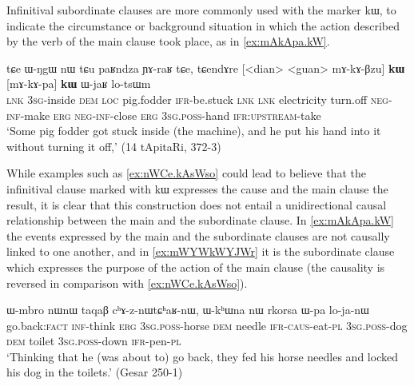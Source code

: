 \documentclass[oldfontcommands,oneside,a4paper,11pt]{article}
\newcommand{\ipa}[1]{{\phon #1}} %
\begin{document}
 Infinitival subordinate clauses are more commonly used with the marker \ipa{kɯ}, to indicate the circumstance or background situation in which the action described by the verb of the main clause took place, as in \ref{ex:mAkApa.kW}. 

\begin{exe}
\ex \label{ex:mAkApa.kW}
\gll
\ipa{tɕe}   	\ipa{ɯ-ŋgɯ}   	\ipa{nɯ} \ipa{tɕu}   	\ipa{paʁndza}   	\ipa{ɲɤ-raʁ}   	\ipa{tɕe,}   	\ipa{tɕendɤre}   	[<dian>   	<guan>   	\ipa{mɤ-kɤ-βzu}] 	\ipa{\textbf{kɯ}}   	[\ipa{mɤ-kɤ-pa}]   	\ipa{\textbf{kɯ}}   	\ipa{ɯ-jaʁ}   	\ipa{lo-tsɯm}   \\
\textsc{lnk} \textsc{3sg}-inside \textsc{dem} \textsc{loc} pig.fodder \textsc{ifr}-be.stuck \textsc{lnk}
\textsc{lnk} electricity turn.off \textsc{neg-inf}-make \textsc{erg}  \textsc{neg-inf}-close \textsc{erg}  \textsc{3sg.poss}-hand \textsc{ifr:upstream}-take \\
\glt `Some pig fodder got stuck inside (the machine), and he put his hand into it without turning it off,' (14 tApitaRi, 372-3)
\end{exe} 

 While  examples such as \ref{ex:nWCe.kAsWso} could lead to believe that the infinitival clause marked with \ipa{kɯ}  expresses the cause and the main clause the result, it is clear that this construction does not entail a unidirectional causal relationship between the main and the subordinate clause. In \ref{ex:mAkApa.kW} the events expressed by the main and the subordinate clauses are not causally linked to one another, and in  \ref{ex:mWYWkWYJWr} it is the subordinate clause which expresses the purpose of the action of the main clause (the causality is reversed in comparison with \ref{ex:nWCe.kAsWso}).

  \begin{exe}
\ex \label{ex:nWCe.kAsWso}
\gll 
[\ipa{nɯɕe}  	\ipa{kɤ-sɯso}]  	\ipa{kɯ,}  	\ipa{ɯ-mbro}  	\ipa{nɯnɯ}  	\ipa{taqaβ}  	\ipa{cʰɤ-z-nɯtɕʰaʁ-nɯ,}  	\ipa{ɯ-kʰɯna}  	\ipa{nɯ}  	\ipa{rkorsa}  	\ipa{ɯ-pa}  	\ipa{lo-ja-nɯ}  \\
go.back:\textsc{fact} \textsc{inf}-think \textsc{erg} \textsc{3sg.poss}-horse \textsc{dem} needle \textsc{ifr-caus}-eat-\textsc{pl}   \textsc{3sg.poss}-dog \textsc{dem} toilet \textsc{3sg.poss}-down \textsc{ifr}-pen-\textsc{pl} \\
\glt `Thinking that he (was about to) go back, they fed his horse needles and locked his dog in the toilets.' (Gesar 250-1)
 \end{exe} 
 
\end{document}
